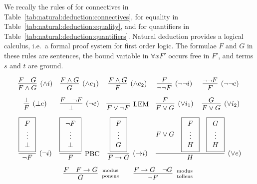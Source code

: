 
\begin{definition}\label{def:natural:deduction}
	We recally the rules of  for connectives
	in Table~\ref{tab:natural:deduction:connectives},
	for equality in Table~\ref{tab:natural:deduction:equality},
	and for quantifiers in Table~\ref{tab:natural:deduction:quantifiers}.
	Natural deduction provides a logical calculus,
	i.e.~a formal proof system for first order logic.
	The formulae \( F \) and \( G \) in these rules are sentences,
	the bound variable in  \( \forall x F' \) occurs free in \( F' \),
	and terms \( s \) and \( t \) are ground.

\begin{table}[hbt]
\begin{gather*}
\begin{array}{ccccc}
\infer[(\land i)]{F\land G}{F & G}
&
\infer[(\land e_1)]{G}{F \land G}
&
\infer[(\land e_2)]{F}{F \land G}
&
\infer[(\lnot\lnot i)]{\lnot\lnot F}{F}
&
\infer[(\lnot\lnot e)]{F}{\lnot\lnot F}
\\[0.7em]
\infer[(\bot e)]{F}{\bot}
&
\infer[(\lnot e)]{\bot}{F & \lnot F}
&
\infer[\text{LEM}]{F\lor\lnot F}{}
&
\infer[(\lor i_1)]{F\lor G}{F}
&
\infer[(\lor i_2)]{F\lor G}{G}
\\[0.7em]
\infer[(\lnot i)]{\lnot F}{
	\boxed{\begin{array}{c}F \\ \vdots \\ \bot \end{array}}}
&
\infer[\text{PBC}]{F}{
	\boxed{\begin{array}{c}\lnot F \\ \vdots \\ \bot \end{array}}}
&
\infer[({\limp} i)]{F\limp G}{
	\boxed{\begin{array}{c}F \\ \vdots \\ G \end{array}
}}
&
\multicolumn{2}{l}{
	\infer[(\lor e)]{H}{
		F\lor G &
		\boxed{\begin{array}{c}F \\ \vdots \\ H \end{array}} &
		\boxed{\begin{array}{c}G \\ \vdots \\ H \end{array}}
	}
}
\\[0.7em]
&
\multicolumn{3}{r}{
\infer[\text{modus}\atop\text{ponens}]{G}{F & F\limp G}
\qquad
\infer[\text{modus}\atop\text{tollens}]{\lnot F}{F\limp G & \lnot G}
}
&
\end{array}
\end{gather*}
\caption{Natural Deduction Rules for Connectives}\label{tab:natural:deduction:connectives}
\end{table}


\end{definition}
